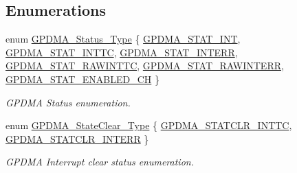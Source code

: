 \subsection*{\-Enumerations}
\begin{DoxyCompactItemize}
\item 
enum \hyperlink{group___g_p_d_m_a___public___types_ga456b34475c3dc2d589cb06dcc13f4159}{\-G\-P\-D\-M\-A\-\_\-\-Status\-\_\-\-Type} \{ \*
\hyperlink{group___g_p_d_m_a___public___types_gga456b34475c3dc2d589cb06dcc13f4159af89b610470a940617af6bef4f4451aa9}{\-G\-P\-D\-M\-A\-\_\-\-S\-T\-A\-T\-\_\-\-I\-N\-T}, 
\hyperlink{group___g_p_d_m_a___public___types_gga456b34475c3dc2d589cb06dcc13f4159ac093908914ed40148e81169fc15df2f7}{\-G\-P\-D\-M\-A\-\_\-\-S\-T\-A\-T\-\_\-\-I\-N\-T\-T\-C}, 
\hyperlink{group___g_p_d_m_a___public___types_gga456b34475c3dc2d589cb06dcc13f4159aee7927c433e007f270c365bcca865706}{\-G\-P\-D\-M\-A\-\_\-\-S\-T\-A\-T\-\_\-\-I\-N\-T\-E\-R\-R}, 
\hyperlink{group___g_p_d_m_a___public___types_gga456b34475c3dc2d589cb06dcc13f4159a4a74b1bc907fbbdbf9dfb05222f0b513}{\-G\-P\-D\-M\-A\-\_\-\-S\-T\-A\-T\-\_\-\-R\-A\-W\-I\-N\-T\-T\-C}, 
\*
\hyperlink{group___g_p_d_m_a___public___types_gga456b34475c3dc2d589cb06dcc13f4159ad547775dc5510034932bf1597931e899}{\-G\-P\-D\-M\-A\-\_\-\-S\-T\-A\-T\-\_\-\-R\-A\-W\-I\-N\-T\-E\-R\-R}, 
\hyperlink{group___g_p_d_m_a___public___types_gga456b34475c3dc2d589cb06dcc13f4159a711d88f645a203338f297a286b912767}{\-G\-P\-D\-M\-A\-\_\-\-S\-T\-A\-T\-\_\-\-E\-N\-A\-B\-L\-E\-D\-\_\-\-C\-H}
 \}
\begin{DoxyCompactList}\small\item\em \-G\-P\-D\-M\-A \-Status enumeration. \end{DoxyCompactList}\item 
enum \hyperlink{group___g_p_d_m_a___public___types_ga7c7fb8a1b77cbd2c7593bf265b2c0cd3}{\-G\-P\-D\-M\-A\-\_\-\-State\-Clear\-\_\-\-Type} \{ \hyperlink{group___g_p_d_m_a___public___types_gga7c7fb8a1b77cbd2c7593bf265b2c0cd3a9a0c8256eb0f656d56f065914219c96c}{\-G\-P\-D\-M\-A\-\_\-\-S\-T\-A\-T\-C\-L\-R\-\_\-\-I\-N\-T\-T\-C}, 
\hyperlink{group___g_p_d_m_a___public___types_gga7c7fb8a1b77cbd2c7593bf265b2c0cd3af6e975b9dfa7d659d18a377c7873b92a}{\-G\-P\-D\-M\-A\-\_\-\-S\-T\-A\-T\-C\-L\-R\-\_\-\-I\-N\-T\-E\-R\-R}
 \}
\begin{DoxyCompactList}\small\item\em \-G\-P\-D\-M\-A \-Interrupt clear status enumeration. \end{DoxyCompactList}\end{DoxyCompactItemize}


